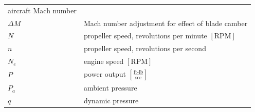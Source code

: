 \documentclass[
]{book}
\begin{document}
\begin{longtable}[]{@{}ll@{}}
\begin{minipage}[t]{0.80\columnwidth}
aircraft Mach number\strut
\end{minipage}\tabularnewline
\begin{minipage}[t]{0.14\columnwidth}\raggedright
\(\Delta M\)\strut
\end{minipage} & \begin{minipage}[t]{0.80\columnwidth}\raggedright
Mach number adjustment for effect of blade camber\strut
\end{minipage}\tabularnewline
\begin{minipage}[t]{0.14\columnwidth}\raggedright
\(N\)\strut
\end{minipage} & \begin{minipage}[t]{0.80\columnwidth}\raggedright
propeller speed, revolutions per minute \(\left[ \text{RPM} \right]\)\strut
\end{minipage}\tabularnewline
\begin{minipage}[t]{0.14\columnwidth}\raggedright
\(n\)\strut
\end{minipage} & \begin{minipage}[t]{0.80\columnwidth}\raggedright
propeller speed, revolutions per second\strut
\end{minipage}\tabularnewline
\begin{minipage}[t]{0.14\columnwidth}\raggedright
\(N_e\)\strut
\end{minipage} & \begin{minipage}[t]{0.80\columnwidth}\raggedright
engine speed \(\left[ \text{RPM} \right]\)\strut
\end{minipage}\tabularnewline
\begin{minipage}[t]{0.14\columnwidth}\raggedright
\(P\)\strut
\end{minipage} & \begin{minipage}[t]{0.80\columnwidth}\raggedright
power output \(\left[ \frac{\text{ft-lb}}{\text{sec}} \right]\)\strut
\end{minipage}\tabularnewline
\begin{minipage}[t]{0.14\columnwidth}\raggedright
\(P_a\)\strut
\end{minipage} & \begin{minipage}[t]{0.80\columnwidth}\raggedright
ambient pressure\strut
\end{minipage}\tabularnewline
\begin{minipage}[t]{0.14\columnwidth}\raggedright
\(q\)\strut
\end{minipage} & \begin{minipage}[t]{0.80\columnwidth}\raggedright
dynamic pressure\strut

\end{minipage}
\end{longtable}
\end{document}

